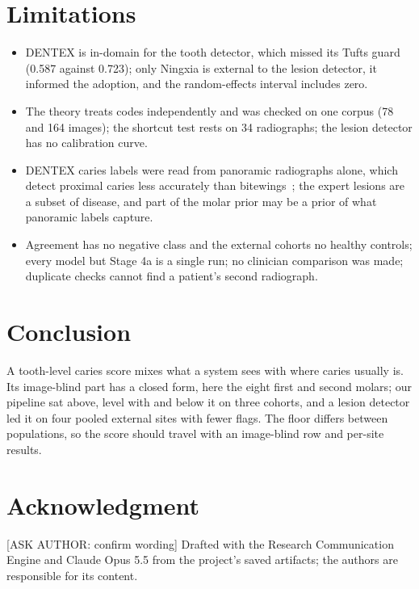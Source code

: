 \documentclass[conference]{IEEEtran}
\begin{document}
\section{Limitations}

\begin{itemize}
\item DENTEX is in-domain for the tooth detector, which missed its Tufts guard (0.587 against 0.723); only Ningxia is external to the lesion detector, it informed the adoption, and the random-effects interval includes zero.
\item The theory treats codes independently and was checked on one corpus (78 and 164 images); the shortcut test rests on 34 radiographs; the lesion detector has no calibration curve.
\item DENTEX caries labels were read from panoramic radiographs alone, which detect proximal caries less accurately than bitewings~\cite{akarslan2008comparison}; the expert lesions are a subset of disease, and part of the molar prior may be a prior of what panoramic labels capture.
\item Agreement has no negative class and the external cohorts no healthy controls; every model but Stage 4a is a single run; no clinician comparison was made; duplicate checks cannot find a patient's second radiograph.
\end{itemize}

\section{Conclusion}

A tooth-level caries score mixes what a system sees with where caries usually is. Its image-blind part has a closed form, here the eight first and second molars; our pipeline sat above, level with and below it on three cohorts, and a lesion detector led it on four pooled external sites with fewer flags. The floor differs between populations, so the score should travel with an image-blind row and per-site results.

\section*{Acknowledgment}

[ASK AUTHOR: confirm wording] Drafted with the Research Communication Engine and Claude Opus 5.5 from the project's saved artifacts; the authors are responsible for its content.



\end{document}
